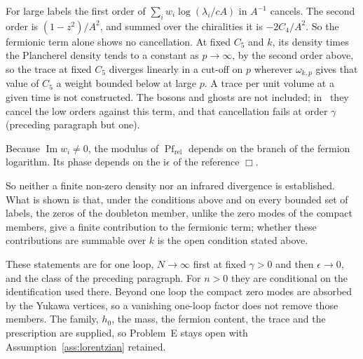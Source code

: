 For large labels the first order of \(\sum_iw_i\log(\lambda_i/cA)\) in \(A^{-1}\) cancels. The second order is \((1-z^2)/A^2\), and summed over the chiralities it is \(-2C_4/A^2\). So the fermionic term alone shows no cancellation. At fixed \(C_5\) and \(k\), its density times the Plancherel density tends to a constant as \(p\to\infty\), by the second order above, so the trace at fixed \(C_5\) diverges linearly in a cut-off on \(p\) wherever \(\omega_{k,p}\) gives that value of \(C_5\) a weight bounded below at large \(p\). A trace per unit volume at a given time is not constructed. The bosons and ghosts are not included; in~\cite{Steinacker2023} they cancel the low orders against this term, and that cancellation fails at order \(\gamma\) (preceding paragraph but one).

Because \(\operatorname{Im}w_i\neq0\), the modulus of \(\operatorname{Pf}_{\mathrm{rel}}\) depends on the branch of the fermion logarithm. Its phase depends on the \(\mathrm i\epsilon\) of the reference \(\Box\).

So neither a finite non-zero density nor an infrared divergence is established. What is shown is that, under the conditions above and on every bounded set of labels, the zeros of the doubleton member, unlike the zero modes of the compact members, give a finite contribution to the fermionic term; whether these contributions are summable over \(k\) is the open condition stated above.

These statements are for one loop, \(N\to\infty\) first at fixed \(\gamma>0\) and then \(\epsilon\to0\), and the class of the preceding paragraph. For \(n>0\) they are conditional on the identification used there. Beyond one loop the compact zero modes are absorbed by the Yukawa vertices, so a vanishing one-loop factor does not remove those members. The family, \(h_0\), the mass, the fermion content, the trace and the prescription are supplied, so Problem~E stays open with Assumption~\ref{ass:lorentzian} retained.
